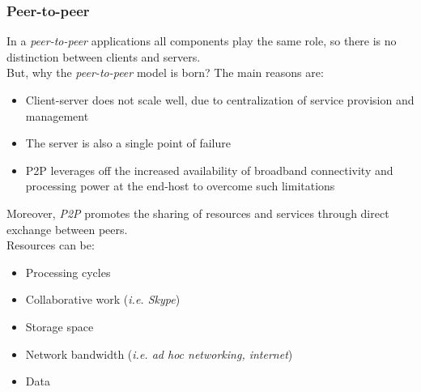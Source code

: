 \documentclass{article}
\begin{document}
    \subsubsection{Peer-to-peer}
    In a \textit{peer-to-peer} applications all components play the same role, so there is no 
    distinction between clients and servers.\\
    But, why the \textit{peer-to-peer} model is born? The main reasons are:
    \begin{itemize}
        \item Client-server does not scale well, due to centralization of service provision and management
        \item The server is also a single point of failure
        \item P2P leverages off the increased availability of broadband connectivity and processing
            power at the end-host to overcome such limitations
    \end{itemize}
    Moreover, \textit{P2P} promotes the sharing of resources and services through direct exchange between peers.\\
    Resources can be:
    \begin{itemize}
        \item Processing cycles
        \item Collaborative work (\textit{i.e. Skype})
        \item Storage space
        \item Network bandwidth (\textit{i.e. ad hoc networking, internet})
        \item Data
    \end{itemize}
\end{document}
